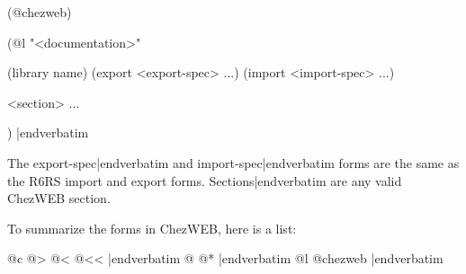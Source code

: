 \medskip\verbatim
(@chezweb)

(@l "<documentation>"

(library name)
(export <export-spec> ...)
(import <import-spec> ...)

<section> ...

)
|endverbatim
\medskip

\noindent
The \verbatim export-spec|endverbatim and \verbatim import-spec|endverbatim forms are the same as the R6RS import and export forms. \verbatim Sections|endverbatim are any valid ChezWEB section. 

To summarize the forms in ChezWEB, here is a list:

\medskip
{}
\verbatim @c @> @< @<< |endverbatim
\verbatim @ @* |endverbatim
\verbatim @l @chezweb |endverbatim
\medskip

\noindent


\bye

